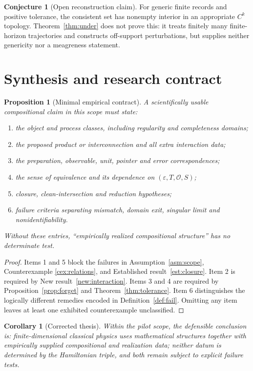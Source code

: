 \documentclass[12pt,a4paper]{article}
\theoremstyle{definition}
\newtheorem{conjecture}[definition]{Conjecture}
\theoremstyle{plain}
\newtheorem{proposition}[definition]{Proposition}
\newtheorem{corollary}[definition]{Corollary}
\theoremstyle{commentary}
\newcommand{\Oc}{\mathcal O}
\newcommand{\eps}{\varepsilon}
\begin{document}
\begin{conjecture}[Open reconstruction claim]
For generic finite records and positive tolerance, the consistent set has nonempty interior in
an appropriate $C^k$ topology.  Theorem~\ref{thm:under} does not prove this: it treats finitely
many finite-horizon trajectories and constructs off-support perturbations, but supplies neither
genericity nor a meagreness statement.
\end{conjecture}

\section{Synthesis and research contract}

\begin{proposition}[Minimal empirical contract]\label{prop:contract}
A scientifically usable compositional claim in this scope must state:
\begin{enumerate}
\item the object and process classes, including regularity and completeness domains;
\item the proposed product or interconnection and all extra interaction data;
\item the preparation, observable, unit, pointer and error correspondences;
\item the sense of equivalence and its dependence on $(\eps,T,\Oc,S)$;
\item closure, clean-intersection and reduction hypotheses;
\item failure criteria separating mismatch, domain exit, singular limit and nonidentifiability.
\end{enumerate}
Without these entries, ``empirically realized compositional structure'' has no determinate test.
\end{proposition}
\begin{proof}
Items 1 and 5 block the failures in Assumption~\ref{asm:scope}, Counterexample
\ref{cex:relations}, and Established result~\ref{est:closure}.  Item 2 is required by New
result~\ref{new:interaction}.  Items 3 and 4 are required by Proposition~\ref{prop:forget} and
Theorem~\ref{thm:tolerance}.  Item 6 distinguishes the logically different remedies encoded in
Definition~\ref{def:fail}.  Omitting any item leaves at least one exhibited counterexample
unclassified.
\end{proof}

\begin{corollary}[Corrected thesis]
Within the pilot scope, the defensible conclusion is: finite-dimensional classical physics uses
mathematical structures together with empirically supplied compositional and realization data;
neither datum is determined by the Hamiltonian triple, and both remain subject to explicit
failure tests.
\end{corollary}
\end{document}

